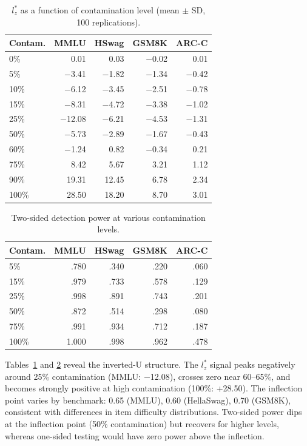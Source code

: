 \documentclass[11pt,a4paper]{article}
\begin{document}
\begin{table}[t]
\centering
\caption{$l_z^*$ as a function of contamination level (mean $\pm$ SD, 100 replications).}
\label{tab:inverted-u}
\small
\begin{tabular}{lrrrr}
\toprule
\textbf{Contam.} & \textbf{MMLU} & \textbf{HSwag} & \textbf{GSM8K} & \textbf{ARC-C} \\
\midrule
0\% & 0.01 & 0.03 & $-$0.02 & 0.01 \\
5\% & $-$3.41 & $-$1.82 & $-$1.34 & $-$0.42 \\
10\% & $-$6.12 & $-$3.45 & $-$2.51 & $-$0.78 \\
15\% & $-$8.31 & $-$4.72 & $-$3.38 & $-$1.02 \\
25\% & $-$12.08 & $-$6.21 & $-$4.53 & $-$1.31 \\
50\% & $-$5.73 & $-$2.89 & $-$1.67 & $-$0.43 \\
60\% & $-$1.24 & 0.82 & $-$0.34 & 0.21 \\
75\% & 8.42 & 5.67 & 3.21 & 1.12 \\
90\% & 19.31 & 12.45 & 6.78 & 2.34 \\
100\% & 28.50 & 18.20 & 8.70 & 3.01 \\
\bottomrule
\end{tabular}
\end{table}

\begin{table}[t]
\centering
\caption{Two-sided detection power at various contamination levels.}
\label{tab:two-sided-power}
\small
\begin{tabular}{lrrrr}
\toprule
\textbf{Contam.} & \textbf{MMLU} & \textbf{HSwag} & \textbf{GSM8K} & \textbf{ARC-C} \\
\midrule
5\% & .780 & .340 & .220 & .060 \\
15\% & .979 & .733 & .578 & .129 \\
25\% & .998 & .891 & .743 & .201 \\
50\% & .872 & .514 & .298 & .080 \\
75\% & .991 & .934 & .712 & .187 \\
100\% & 1.000 & .998 & .962 & .478 \\
\bottomrule
\end{tabular}
\end{table}

Tables~\ref{tab:inverted-u} and \ref{tab:two-sided-power} reveal the inverted-U structure. The $l_z^*$ signal peaks negatively around 25\% contamination (MMLU: $-$12.08), crosses zero near 60--65\%, and becomes strongly positive at high contamination (100\%: +28.50). The inflection point varies by benchmark: 0.65 (MMLU), 0.60 (HellaSwag), 0.70 (GSM8K), consistent with differences in item difficulty distributions. Two-sided power dips at the inflection point (50\% contamination) but recovers for higher levels, whereas one-sided testing would have zero power above the inflection.
\end{document}
